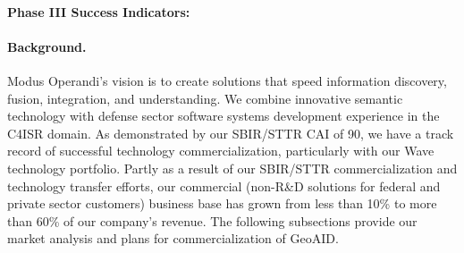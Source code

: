 \documentclass{sbir}
\begin{document}
\paragraph{Phase III Success Indicators:} 
\begin{center}
\vspace{-12pt}
\end{center}

\paragraph{Background.} Modus Operandi's vision is to create solutions that speed information discovery, fusion, integration, and understanding. We combine innovative semantic technology with defense sector software systems development experience in the C4ISR domain. As demonstrated by our SBIR/STTR CAI of 90, we have a track record of successful technology commercialization, particularly with our Wave technology portfolio. Partly as a result of our SBIR/STTR commercialization and technology transfer efforts, our commercial (non-R\&D solutions for federal and private sector customers) business base has grown from less than 10\% to more than 60\% of our company's revenue. The following subsections provide our market analysis and plans for commercialization of GeoAID.
\end{document}
